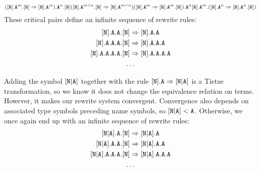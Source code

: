 \documentclass[../generics]{subfiles}
\begin{document}
\begin{example}
\[{(\protosym{N}.\texttt{A}^m.\protosym{N}\Rightarrow\protosym{N}.\texttt{A}^m).\texttt{A}^n.\protosym{N}}%
{(\protosym{N}.\texttt{A}^{m+n}.\protosym{N}\Rightarrow\protosym{N}.\texttt{A}^{m+n})}%
{(\protosym{N}.\texttt{A}^m\Rightarrow\protosym{N}.\texttt{A}^m.\protosym{N}).\texttt{A}^n}%
{\protosym{N}.\texttt{A}^m.(\protosym{N}.\texttt{A}^n\Rightarrow\protosym{N}.\texttt{A}^n.\protosym{N})}
\]
These critical pairs define an infinite sequence of rewrite rules:
\begin{gather*}
\protosym{N}.\texttt{A}.\texttt{A}.\protosym{N}\Rightarrow\protosym{N}.\texttt{A}.\texttt{A}\\
\protosym{N}.\texttt{A}.\texttt{A}.\texttt{A}.\protosym{N}\Rightarrow\protosym{N}.\texttt{A}.\texttt{A}.\texttt{A}\\
\protosym{N}.\texttt{A}.\texttt{A}.\texttt{A}.\texttt{A}.\protosym{N}\Rightarrow\protosym{N}.\texttt{A}.\texttt{A}.\texttt{A}.\texttt{A}\\
\ldots
\end{gather*}

Adding the symbol $[\texttt{N}|\texttt{A}]$ together with the rule $[\texttt{N}].\texttt{A}\Rightarrow[\texttt{N}|\texttt{A}]$ is a Tietze transformation, so we know it does not change the equivalence relation on terms. However, it makes our rewrite system convergent. Convergence also depends on associated type symbols preceding name symbols, so $[\texttt{N}|\texttt{A}]<\texttt{A}$. Otherwise, we once again end up with an infinite sequence of rewrite rules:
\begin{gather*}
\assocsym{N}{A}.\texttt{A}.\protosym{N}\Rightarrow\assocsym{N}{A}.\texttt{A}\\
\assocsym{N}{A}.\texttt{A}.\texttt{A}.\protosym{N}\Rightarrow\assocsym{N}{A}.\texttt{A}.\texttt{A}\\
\assocsym{N}{A}.\texttt{A}.\texttt{A}.\texttt{A}.\protosym{N}\Rightarrow\assocsym{N}{A}.\texttt{A}.\texttt{A}.\texttt{A}\\
\ldots
\end{gather*}


\end{example}
\end{document}
